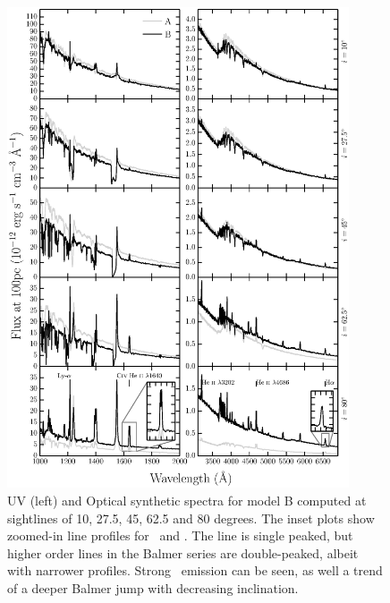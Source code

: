 \documentclass[preprint, a4paper, 11pt]{aastex}
\begin{document}
\begin{figure} %
\includegraphics[width=0.9\textwidth]{figures/modelb_uv_opt.eps}
\caption{
UV (left) and Optical synthetic spectra for model B computed at
sightlines of 10, 27.5, 45, 62.5 and 80 degrees.	
The inset plots show zoomed-in line profiles for 
\heiiuv\ and \ha. The \ha line 
is single peaked, but higher order lines in the Balmer series
are double-peaked, albeit with narrower profiles.
Strong \heiiopt\ emission can be seen, as well a trend
of a deeper Balmer jump with decreasing inclination.
}
\label{uvoptb}
\end{figure} %
\end{document}
